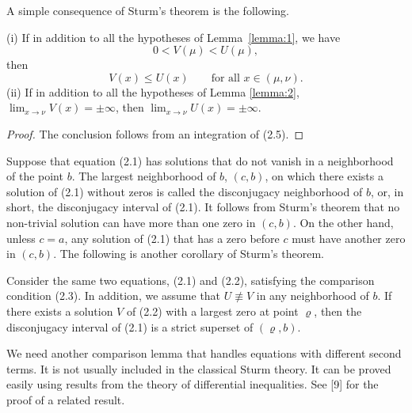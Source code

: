 A simple consequence of Sturm's theorem is the following.

\begin{lemma}\label{lemma:2}
  (i) If in addition to all the hypotheses of Lemma~\ref{lemma:1}, we have
  \begin{equation}
    0 < V(\mu) < U(\mu),
  \end{equation}
  then
  \begin{equation}
    V(x) \leq U(x)\qquad \text{for all } x\in (\mu,\nu).
  \end{equation}
  (ii) If in addition to all the hypotheses of Lemma \ref{lemma:2},
  $\lim_{x\to \nu} V(x) = \pm\infty$, then
  $\lim_{x\to\nu} U(x) = \pm\infty$.
\end{lemma}

\begin{proof}
  The conclusion follows from an integration of (2.5).
\end{proof}

Suppose that equation (2.1) has solutions that do not vanish
in a neighborhood of the point $b$.
The largest neighborhood of $b$, $(c,b)$, on which there exists
a solution of (2.1) without zeros is called the disconjugacy
neighborhood of $b$, or, in short, the disconjugacy interval
of (2.1). It follows from Sturm's theorem that no non-trivial
solution can have more than one zero in $(c,b)$.
On the other hand, unless $c=a$, any solution of (2.1)
that has a zero before $c$ must have another zero in $(c,b)$.
The following is another corollary of Sturm's theorem.

\begin{lemma}\label{lemma:3}
  Consider the same two equations, (2.1) and (2.2), satisfying
  the comparison condition (2.3).
  In addition, we assume that $U\not\equiv V$
  in any neighborhood of $b$. If there exists a solution $V$
  of (2.2) with a largest zero at point $\varrho$,
  then the disconjugacy interval of (2.1) is a strict superset of $(\varrho, b)$.
\end{lemma}

We need another comparison lemma that handles equations with different second terms.
It is not usually included in the classical Sturm theory.
It can be proved easily using results from the theory of differential inequalities.
See [9] for the proof of a related result.

